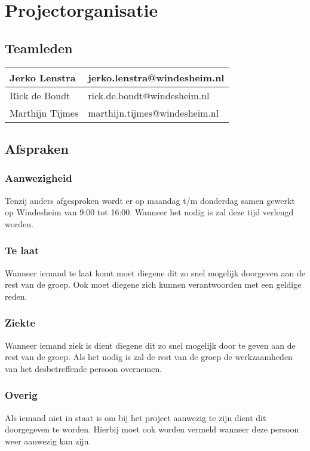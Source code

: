 \section{Projectorganisatie}
\subsection{Teamleden}
\begin{tabularx}{\textwidth}{| X | X |}
	\hline
	Jerko Lenstra & jerko.lenstra@windesheim.nl \\ \hline
	Rick de Bondt & rick.de.bondt@windesheim.nl \\ \hline
	Marthijn Tijmes & marthijn.tijmes@windesheim.nl \\
	\hline
\end{tabularx}

\subsection{Afspraken}
\subsubsection{Aanwezigheid}
Tenzij anders afgesproken wordt er op maandag t/m donderdag samen gewerkt op Windesheim van 9:00 tot
16:00. Wanneer het nodig is zal deze tijd verlengd worden.

\subsubsection{Te laat}
Wanneer iemand te laat komt moet diegene dit zo snel mogelijk doorgeven aan
de rest van de groep. Ook moet diegene zich kunnen verantwoorden met een
geldige reden.

\subsubsection{Ziekte}
Wanneer iemand ziek is dient diegene dit zo snel mogelijk door te geven aan
de rest van de groep. Als het nodig is zal de rest van de groep de werkzaamheden
van het desbetreffende persoon overnemen.

\subsubsection{Overig}
Als iemand niet in staat is om bij het project aanwezig te zijn dient dit doorgegeven
te worden. Hierbij moet ook worden vermeld wanneer deze persoon weer aanwezig kan
zijn.
